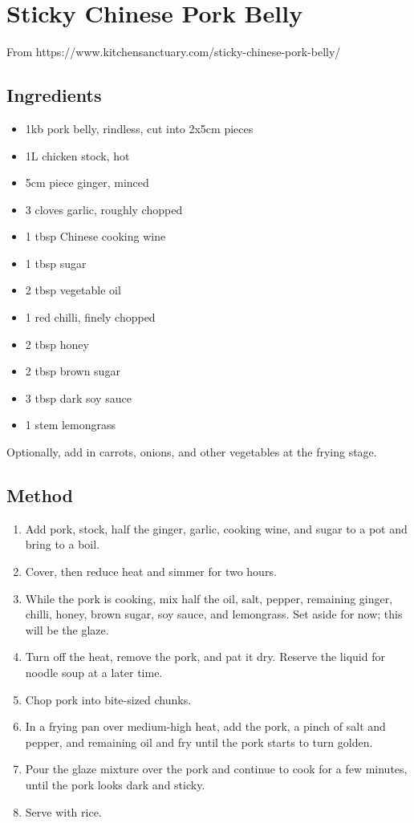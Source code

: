 \section{Sticky Chinese Pork Belly}


From https://www.kitchensanctuary.com/sticky-chinese-pork-belly/

\subsection{Ingredients}

\begin{itemize}
	\item 1kb pork belly, rindless, cut into 2x5cm pieces
	\item 1L chicken stock, hot
	\item 5cm piece ginger, minced
	\item 3 cloves garlic, roughly chopped
	\item 1 tbsp Chinese cooking wine
	\item 1 tbsp sugar
	\item 2 tbsp vegetable oil
	\item 1 red chilli, finely chopped
	\item 2 tbsp honey
	\item 2 tbsp brown sugar
	\item 3 tbsp dark soy sauce
	\item 1 stem lemongrass
\end{itemize}

Optionally, add in carrots, onions, and other vegetables at the frying stage.

\subsection{Method}

\begin{enumerate}
	\item Add pork, stock, half the ginger, garlic, cooking wine, and sugar to a pot and bring to a boil.
	\item Cover, then reduce heat and simmer for two hours.
	\item While the pork is cooking, mix half the oil, salt, pepper, remaining ginger, chilli, honey, brown sugar, soy sauce, and lemongrass. Set aside for now; this will be the glaze.
	\item Turn off the heat, remove the pork, and pat it dry. Reserve the liquid for noodle soup at a later time.
	\item Chop pork into bite-sized chunks.
	\item In a frying pan over medium-high heat, add the pork, a pinch of salt and pepper, and remaining oil and fry until the pork starts to turn golden.
	\item Pour the glaze mixture over the pork and continue to cook for a few minutes, until the pork looks dark and sticky.
	\item Serve with rice.
\end{enumerate}
